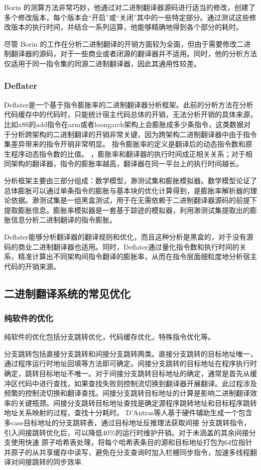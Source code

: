Borin 的测算方法非常巧妙，他通过对二进制翻译器源码进行适当的修改，创建了多个修改版本，每个版本会“开启”或“关闭”其中的一些特定部分。通过测试这些修改版本的执行时间，并结合一系列运算，他能够精确地得到各个部分的耗时。

尽管 Borin 的工作在分析二进制翻译的开销方面较为全面，但由于需要修改二进制翻译器的源码，对于一些商业或者闭源的翻译器并不适用。同时，他的分析方法仅适用于同一指令集的同源二进制翻译器，因此其通用性较差。
\subsubsection{Deflater}
Deflater是一个基于指令膨胀率的二进制翻译器分析框架。此前的分析方法在分析代码缓存中的代码时，只能统计宿主代码总体的开销，无法分析开销的具体来源，比如x86的add指令在arm或者loongarch架构上会膨胀成多少条指令，这类数据对于分析跨架构的二进制翻译的开销非常关键，因为跨架构二进制翻译器中由于指令集差异带来的指令开销非常明显。
指令膨胀率的定义是翻译后的动态指令数和原生程序动态指令数的比值。
，膨胀率和翻译器的执行时间成正相关关系；对于相同架构的翻译器，指令的膨胀率越高，翻译器在同一平台上的执行时间越长。

分析框架主要由三部分组成：数学模型，渺测试集和膨胀模拟器。数学模型论证了总体膨胀可以通过单条指令的膨胀与基本块的优化计算得到，是膨胀率解析器的理论依据。渺测试集是一组黑盒测试，用于在无需依赖于二进制翻译器源码的前提下提取膨胀信息。膨胀率模拟器是一套基于踪迹的模拟器，利用渺测试集提取出的膨胀信息分析二进制翻译的指令膨胀。

Deflater能够分析翻译器的翻译规则和优化，而且这种分析是黑盒的，对于没有源码的商业二进制翻译器也适用。同时，Deflater通过量化指令数和执行时间的关系，精准计算出不同架构间指令翻译的膨胀率，从而在指令层面细粒度地分析宿主代码的开销来源。
\subsection{二进制翻译系统的常见优化}
\subsubsection{纯软件的优化}
纯软件的优化包括分支跳转优化，代码缓存优化，特殊指令优化等。

分支跳转包括直接分支跳转和间接分支跳转两类。直接分支跳转的目标地址唯一，通过程序运行时地址回填等方法即可确定。间接分支跳转的目标地址在程序执行时确定，跳转目标地址不唯一。对于间接分支跳转目标地址的确定，通常是首先从缓冲区代码中进行查找，如果查找失败则控制流切换到翻译器开展翻译。此过程涉及频繁的控制流切换和翻译查找。间接分支跳转目标地址的计算是影响二进制翻译效率的关键瓶颈。间接分支跳转目标地址查找是确定源程序跳转地址和目标程序跳转地址关系映射的过程，查找十分耗时。 D’Antras等人基于硬件辅助生成一个包含多case目标地址的分支跳转表，通过目标地址反推理法获取间接 分支跳转指令，引入间接跳转优化后，可以降低40{\%}的运行时维护开销。对于未涵盖的其余间接分支使用快速 原子哈希表处理，将每个哈希表条目的源和目标地址打包为64位指针并原子的从共享缓存中读写，避免在分支查询时加入栏栅同步指令，加速多线程翻译对间接跳转的同步效率.

